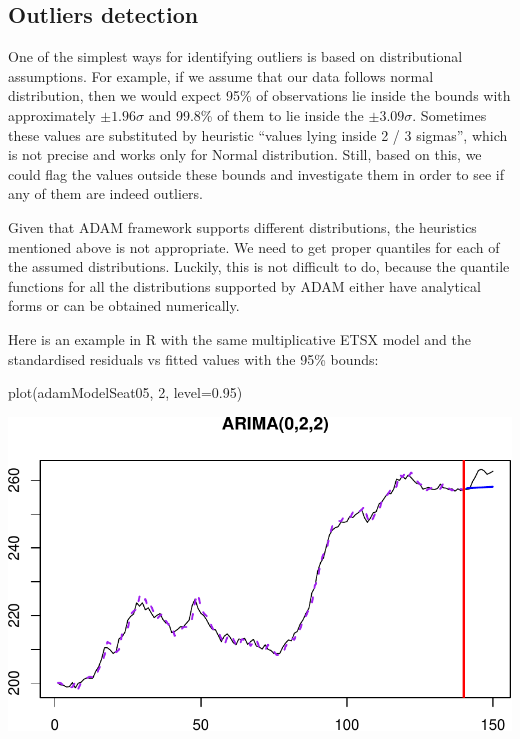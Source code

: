 \documentclass[
]{book}
\newenvironment{Shaded}{\begin{snugshade}}{\end{snugshade}}
\newcommand{\AttributeTok}[1]{\textcolor[rgb]{0.77,0.63,0.00}{#1}}
\newcommand{\DecValTok}[1]{\textcolor[rgb]{0.00,0.00,0.81}{#1}}
\newcommand{\FloatTok}[1]{\textcolor[rgb]{0.00,0.00,0.81}{#1}}
\newcommand{\FunctionTok}[1]{\textcolor[rgb]{0.00,0.00,0.00}{#1}}
\newcommand{\NormalTok}[1]{#1}
\theoremstyle{definition}
\theoremstyle{definition}
\theoremstyle{definition}
\theoremstyle{definition}
\theoremstyle{remark}
\begin{document}
\hypertarget{outliers-detection}{%
\subsection{Outliers detection}\label{outliers-detection}}

One of the simplest ways for identifying outliers is based on distributional assumptions. For example, if we assume that our data follows normal distribution, then we would expect 95\% of observations lie inside the bounds with approximately \(\pm 1.96\sigma\) and 99.8\% of them to lie inside the \(\pm3.09 \sigma\). Sometimes these values are substituted by heuristic ``values lying inside 2 / 3 sigmas'', which is not precise and works only for Normal distribution. Still, based on this, we could flag the values outside these bounds and investigate them in order to see if any of them are indeed outliers.

Given that ADAM framework supports different distributions, the heuristics mentioned above is not appropriate. We need to get proper quantiles for each of the assumed distributions. Luckily, this is not difficult to do, because the quantile functions for all the distributions supported by ADAM either have analytical forms or can be obtained numerically.

Here is an example in R with the same multiplicative ETSX model and the standardised residuals vs fitted values with the 95\% bounds:

\begin{Shaded}
\begin{Highlighting}[]
\FunctionTok{plot}\NormalTok{(adamModelSeat05, }\DecValTok{2}\NormalTok{, }\AttributeTok{level=}\FloatTok{0.95}\NormalTok{)}
\end{Highlighting}
\end{Shaded}

\includegraphics{adam_files/figure-latex/unnamed-chunk-140-1.pdf}
\end{document}
